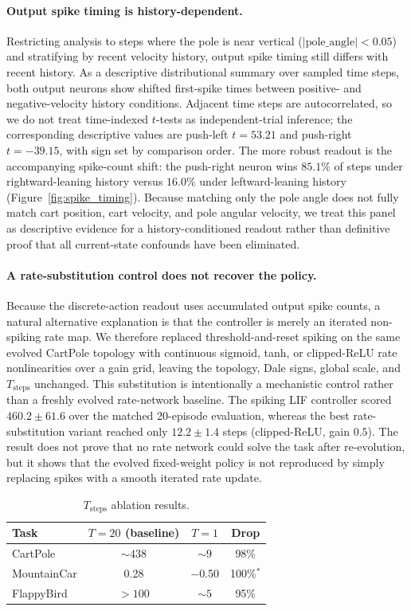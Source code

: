 \documentclass[10pt]{article}
\begin{document}
\paragraph{Output spike timing is history-dependent.}
Restricting analysis to steps where the pole is near vertical
($|\text{pole\_angle}|<0.05$) and stratifying by recent velocity history, output
spike timing still differs with recent history. As a descriptive distributional
summary over sampled time steps, both output neurons show shifted first-spike
times between positive- and negative-velocity history conditions. Adjacent time
steps are autocorrelated, so we do not treat time-indexed $t$-tests as
independent-trial inference; the corresponding descriptive values are
push-left $t=53.21$ and push-right $t=-39.15$, with sign set by comparison
order. The more robust readout is the accompanying spike-count shift: the
push-right neuron wins $85.1\%$ of steps under rightward-leaning history versus
$16.0\%$ under leftward-leaning history (Figure~\ref{fig:spike_timing}). Because
matching only the pole angle does not fully match cart position, cart velocity,
and pole angular velocity, we treat this panel as descriptive evidence for a
history-conditioned readout rather than definitive proof that all current-state
confounds have been eliminated.

\paragraph{A rate-substitution control does not recover the policy.}
Because the discrete-action readout uses accumulated output spike counts, a
natural alternative explanation is that the controller is merely an iterated
non-spiking rate map. We therefore replaced threshold-and-reset spiking on the
same evolved CartPole topology with continuous sigmoid, tanh, or clipped-ReLU
rate nonlinearities over a gain grid, leaving the topology, Dale signs, global
scale, and $T_\text{steps}$ unchanged. This substitution is intentionally a
mechanistic control rather than a freshly evolved rate-network baseline. The
spiking LIF controller scored $460.2\pm61.6$ over the matched 20-episode
evaluation, whereas the best rate-substitution variant reached only
$12.2\pm1.4$ steps (clipped-ReLU, gain $0.5$). The result does not prove that no
rate network could solve the task after re-evolution, but it shows that the
evolved fixed-weight policy is not reproduced by simply replacing spikes with a
smooth iterated rate update.

\begin{table}[H]
\centering
\caption{$T_\text{steps}$ ablation results.}
\label{tab:tsteps-ablation}
\begin{tabular}{@{}lccc@{}}
\toprule
\textbf{Task} & \textbf{$T=20$ (baseline)} & \textbf{$T=1$} & \textbf{Drop} \\
\midrule
CartPole & ${\sim}438$ & ${\sim}9$ & 98\% \\
MountainCar & 0.28 & $-$0.50 & 100\%$^*$ \\
FlappyBird & ${>}100$ & ${\sim}5$ & 95\% \\
\bottomrule
\end{tabular}
\end{table}
\end{document}
